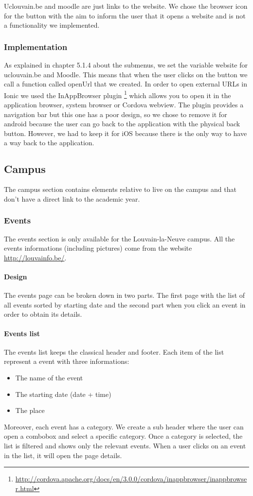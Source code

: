 \documentclass{eplmastersthesis}
\begin{document}
Uclouvain.be and moodle are just links to the website. We chose the browser icon for the button with the aim to inform the user that it opens a website and is not a functionality we implemented. 
\subsubsection{Implementation}
As explained in chapter 5.1.4 about the submenus, we set the variable website for uclouvain.be and Moodle. This means that when the user clicks on the button we call a function called openUrl that we created. In order to open external URLs in Ionic we used the InAppBrowser plugin \footnote{\url{http://cordova.apache.org/docs/en/3.0.0/cordova/inappbrowser/inappbrowser.html}} which allows you to open it in the application browser, system browser or Cordova webview. The plugin provides a navigation bar but this one has a poor design, so we chose to remove it for android because the user can go back to the application with the physical back button. However, we had to keep it for iOS because there is the only way to have a way back to the application. 

\subsection{Campus}
The campus section contains elements relative to live on the campus and that don't have a direct link to the academic year. 

\subsubsection{Events}
The events section is only available for the Louvain-la-Neuve campus. All the events informations (including pictures) come from the website \url{http://louvainfo.be/}.
\paragraph{Design}
The events page can be broken down in two parts. The first page with the list of all events sorted by starting date and the second part when you click an event in order to obtain its details. 
\paragraph{Events list}
The events list keeps the classical header and footer. Each item of the list represent a event with three informations:
\begin{itemize}
\item The name of the event
\item The starting date (date + time)
\item The place
\end{itemize}
Moreover, each event has a category. We create a sub header where the user can open a combobox and select a specific category. Once a category is selected, the list is filtered and shows only the relevant events. When a user clicks on an event in the list, it will open the page details.
\end{document}
